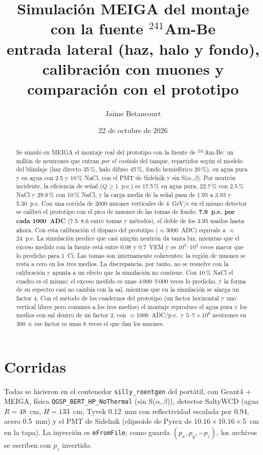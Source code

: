 \documentclass[11pt,a4paper]{article}
\title{Simulación MEIGA del montaje con la fuente $^{241}$Am-Be\\
\large entrada lateral (haz, halo y fondo), calibración con muones y comparación con el prototipo}
\author{Jaime Betancourt}
\date{22 de octubre de 2026}
\begin{document}
\maketitle

\begin{abstract}
Se simuló en MEIGA el montaje real del prototipo con la fuente de $^{241}$Am-Be: un millón de neutrones que
entran \emph{por el costado} del tanque, repartidos según el modelo del blindaje (haz directo 35\,\%, halo
difuso 45\,\%, fondo hemisférico 20\,\%), en agua pura y en agua con 2.5 y 10\,\% NaCl, con el PMT de
Sidelnik y sin S($\alpha,\beta$). Por neutrón incidente, la eficiencia de señal ($Q\geq1$~p.e.) es 17.5\,\% en
agua pura, 22.7\,\% con 2.5\,\% NaCl y 29.8\,\% con 10\,\% NaCl, y la carga media de la señal pasa de 1.95 a
3.93 y 5.30~p.e. Con una corrida de 2000
muones verticales de 4~GeV/c en el mismo detector se calibró el prototipo con el pico de muones de las tomas
de fondo: \textbf{7.9~p.e. por cada 1000~ADC} (7.5--8.6 entre tomas y métodos), el doble de los 3.95 usados
hasta ahora. Con esta calibración el disparo del prototipo ($\approx$3000~ADC) equivale a $\approx$24~p.e.
La simulación predice que casi ningún neutrón da tanta luz, mientras que el exceso medido con la fuente está
entre 0.08 y 0.7~VEM y es $10^3$--$10^4$ veces mayor que lo predicho para 1~Ci. Las tomas son
internamente coherentes: la región de muones se resta a cero en los tres medios. La discrepancia, por tanto,
no se resuelve con la calibración y apunta a un efecto que la simulación no contiene. Con 10\,\% NaCl el
cuadro es el mismo: el exceso medido es unas 4\,000--5\,000 veces lo predicho, y la forma de su espectro casi no
cambia con la sal, mientras que en la simulación se alarga un factor 4. Con el método de los cuadernos del prototipo
(un factor horizontal y uno vertical libres pero comunes a los tres medios) el montaje reproduce el agua pura y
los medios con sal dentro de un factor 2, con $\approx$1000~ADC/p.e.\ y $5$--$7\times10^6$ neutrones en 300~s; ese
factor es unas 8 veces el que dan los muones.
\end{abstract}
\tableofcontents

\section{Corridas}
Todas se hicieron en el contenedor \texttt{silly\_roentgen} del portátil, con Geant4 + MEIGA, física
\texttt{QGSP\_BERT\_HP\_\allowbreak NoThermal} (sin S($\alpha,\beta$)), detector SaltyWCD (agua $R=48$~cm,
$H=133$~cm, Tyvek 0.12~mm con reflectividad escalada por 0.94, acero 0.5~mm) y el PMT de Sidelnik
(elipsoide de Pyrex de $10.16\times10.16\times5$~cm en la tapa). La inyección es \texttt{eFromFile}; como
 guarda $(p_x,p_y,-p_z)$, los archivos se escriben con $p_z$ invertido.
\end{document}
